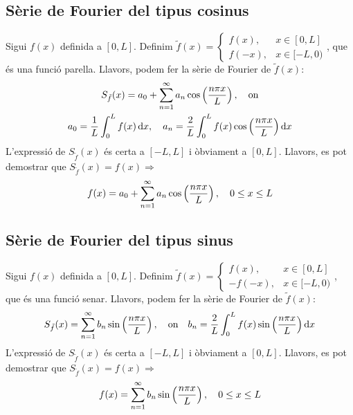 \subsection{Sèrie de Fourier del tipus cosinus}
Sigui $f(x)$ definida a $[0,L]$. Definim $\tilde{f}(x) = \begin{cases} f(x), & x \in [0,L] \\ f(-x), & x \in [-L,0) \end{cases}$, que és una funció parella. Llavors, podem fer la sèrie de Fourier de $\tilde{f}(x)$:
\begin{align*}
\begin{gathered}
    S_{\tilde{f}}(x) = a_{0} + \sum_{n=1}^{\infty} a_{n} \cos \left( \frac{n\pi x}{L} \right), \quad \text{on} \\
a_{0} = \displaystyle \frac{1}{L} \int_{0}^{L} f(x) \mathop{}\!\mathrm{d} x, \quad a_{n} = \frac{2}{L} \int_{0}^{L} f(x) \cos \left( \frac{n \pi x}{L} \right) \mathop{}\!\mathrm{d} x
\end{gathered}
\end{align*}
L'expressió de $S_{\tilde{f}}(x)$ és certa a $[-L,L]$ i òbviament a $[0,L]$. Llavors, es pot demostrar que $S_{\tilde{f}}(x) = f(x) \Rightarrow$
\begin{align}
    f(x) = a_{0} + \sum_{n=1}^{\infty} a_{n} \cos \left( \frac{n\pi x}{L} \right), \quad 0 \leq x \leq L
\end{align}

\subsection{Sèrie de Fourier del tipus sinus}
Sigui $f(x)$ definida a $[0,L]$. Definim $\tilde{f}(x) = \begin{cases} f(x), & x \in [0,L] \\ -f(-x), & x \in [-L,0) \end{cases}$, que és una funció senar. Llavors, podem fer la sèrie de Fourier de $\tilde{f}(x)$:
\begin{align*}
    S_{\tilde{f}}(x) = \sum_{n=1}^{\infty} b_{n} \sin \left( \frac{n\pi x}{L} \right), \quad \text{on} \quad b_{n} = \frac{2}{L} \int_{0}^{L} f(x) \sin \left( \frac{n \pi x}{L} \right) \mathop{}\!\mathrm{d} x
\end{align*}
L'expressió de $S_{\tilde{f}}(x)$ és certa a $[-L,L]$ i òbviament a $[0,L]$. Llavors, es pot demostrar que $S_{\tilde{f}}(x) = f(x) \Rightarrow$
\begin{align}
    f(x) = \sum_{n=1}^{\infty} b_{n} \sin \left( \frac{n\pi x}{L} \right), \quad 0 \leq x \leq L
\end{align}

